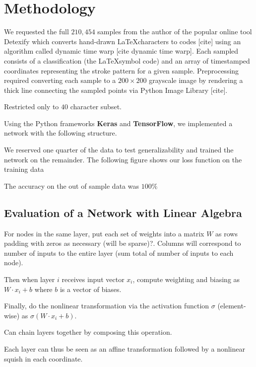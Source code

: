 \documentclass[12pt,letterpaper,boxed]{article}
\begin{document}

\section{Methodology}
		We requested the full $210,454$ samples from the author of the popular online tool Detexify which converts hand-drawn \LaTeX characters to codes [cite] using an algorithm called dynamic time warp [cite dynamic time warp]. Each sampled consists of a classification (the \LaTeX symbol code) and an array of timestamped coordinates representing the stroke pattern for a given sample. Preprocessing required converting each sample to a $200 \times 200$ grayscale image by rendering a thick line connecting the sampled points via Python Image Library [cite]. 

		Restricted only to $40$ character subset.

		Using the Python frameworks \textbf{Keras} and \textbf{TensorFlow}, we implemented a network with the following structure.


		We reserved one quarter of the data to test generalizability and trained the network on the remainder. The following figure shows our loss function on the training data


		The accuracy on the out of sample data was $100\%$

	\subsection{Evaluation of a Network with Linear Algebra}
		For nodes in the same layer, put each set of weights into a matrix $W$ as rows padding with zeros as necessary (will be sparse)?. Columns will correspond to number of inputs to the entire layer (sum total of number of inputs to each node).

		Then when layer $i$ receives input vector $x_i$, compute weighting and biasing as $W \cdot x_i + b$ where $b$ is a vector of biases.

		Finally, do the nonlinear transformation via the activation function $\sigma$ (element-wise) as $\sigma(W \cdot x_i + b)$.

		Can chain layers together by composing this operation.

		Each layer can thus be seen as an affine transformation followed by a nonlinear squish in each coordinate.
\end{document}
